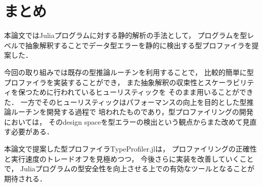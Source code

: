 
\section{まとめ} \label{section:conclusion}

本論文ではJuliaプログラムに対する静的解析の手法として，
プログラムを型レベルで抽象解釈することでデータ型エラーを静的に検出する型プロファイラを提案した．

今回の取り組みでは既存の型推論ルーチンを利用することで，
比較的簡単に型プロファイラを実装することができ，
また抽象解釈の収束性とスケーラビリティを保つために行われているヒューリスティックを
そのまま用いることができた．
一方でそのヒューリスティックはパフォーマンスの向上を目的とした型推論ルーチンを開発する過程で
培われたものであり，型プロファイリングの開発においては，
そのdesign spaceを型エラーの検出という観点からまた改めて見直す必要がある．

本論文で提案した型プロファイラTypeProfiler.jlは，
プロファイリングの正確性と実行速度のトレードオフを見極めつつ，
今後さらに実装を改善していくことで，
Juliaプログラムの型安全性を向上させる上での有効なツールとなることが期待される．
